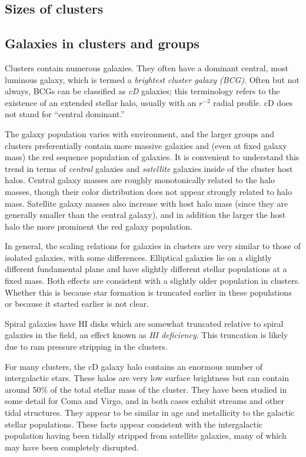 \subsection{Sizes of clusters}


\subsection{Galaxies in clusters and groups}

Clusters contain numerous galaxies. They often have a dominant
central, most luminous galaxy, which is termed a {\it brightest
cluster galaxy (BCG)}. Often but not always, BCGs can be classified as
{\it cD} galaxies; this terminology refers to the existence of an
extended stellar halo, usually with an $r^{-2}$ radial profile. cD
does not stand for ``central dominant.'' 

The galaxy population varies with environment, and the larger groups
and clusters preferentially contain more massive galaxies and (even at
fixed galaxy mass) the red sequence population of galaxies. It is
convenient to understand this trend in terms of {\it central} galaxies
and {\it satellite} galaxies inside of the cluster host halos. Central
galaxy masses are roughly monotonically related to the halo masses,
though their color distribution does not appear strongly related to
halo mass. Satellite galaxy masses also increase with host halo mass
(since they are generally smaller than the central galaxy), and in
addition the larger the host halo the more prominent the red galaxy
population.

In general, the scaling relations for galaxies in clusters are very
similar to those of isolated galaxies, with some
differences. Elliptical galaxies lie on a slightly different
fundamental plane and have slightly different stellar populations at a
fixed mass. Both effects are consistent with a slightly older
population in clusters. Whether this is because star formation is
truncated earlier in these populations or because it started earlier
is not clear.

Spiral galaxies have HI disks which are somewhat truncated relative to
spiral galaxies in the field, an effect known as {\it HI
deficiency}. This truncation is likely due to ram pressure stripping
in the clusters.

For many clusters, the cD galaxy halo contains an enormous number of
intergalactic stars. These halos are very low surface brightness but
can contain around 50\% of the total stellar mass of the cluster. They
have been studied in some detail for Coma and Virgo, and in both cases
exhibit streams and other tidal structures. They appear to be similar
in age and metallicity to the galactic stellar populations. These
facts appear consistent with the intergalactic population having been
tidally stripped from satellite galaxies, many of which may have been
completely disrupted.

